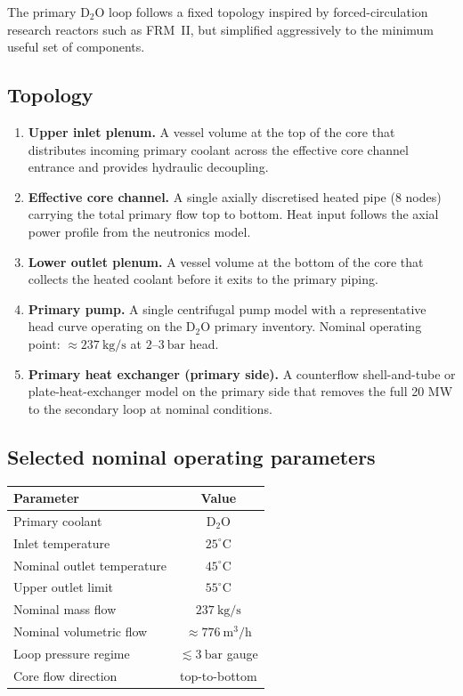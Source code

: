\documentclass[11pt]{article}
\begin{document}
The primary D$_2$O loop follows a fixed topology inspired by
forced-circulation research reactors such as FRM~II, but simplified
aggressively to the minimum useful set of components.

\subsection{Topology}

\begin{enumerate}
  \item \textbf{Upper inlet plenum.}  A vessel volume at the top of the
        core that distributes incoming primary coolant across the
        effective core channel entrance and provides hydraulic
        decoupling.
  \item \textbf{Effective core channel.}  A single axially discretised
        heated pipe (8 nodes) carrying the total primary flow top to
        bottom.  Heat input follows the axial power profile from the
        neutronics model.
  \item \textbf{Lower outlet plenum.}  A vessel volume at the bottom of
        the core that collects the heated coolant before it exits to the
        primary piping.
  \item \textbf{Primary pump.}  A single centrifugal pump model with a
        representative head curve operating on the D$_2$O primary
        inventory.  Nominal operating point: $\approx 237\ \mathrm{kg/s}$
        at $2$--$3\ \mathrm{bar}$ head.
  \item \textbf{Primary heat exchanger (primary side).}  A counterflow
        shell-and-tube or plate-heat-exchanger model on the primary side
        that removes the full 20 MW to the secondary loop at nominal
        conditions.
\end{enumerate}

\subsection{Selected nominal operating parameters}

\begin{center}
\begin{tabular}{lc}
\hline
Parameter & Value \\
\hline
Primary coolant & D$_2$O \\
Inlet temperature & $25^{\circ}\mathrm{C}$ \\
Nominal outlet temperature & $45^{\circ}\mathrm{C}$ \\
Upper outlet limit & $55^{\circ}\mathrm{C}$ \\
Nominal mass flow & $237\ \mathrm{kg/s}$ \\
Nominal volumetric flow & $\approx 776\ \mathrm{m^3/h}$ \\
Loop pressure regime & $\lesssim 3\ \mathrm{bar}$ gauge \\
Core flow direction & top-to-bottom \\
\hline
\end{tabular}
\end{center}
\end{document}
